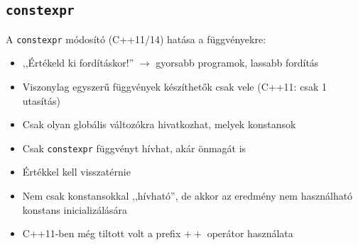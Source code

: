 \begin{frame}
    \begin{exampleblock}{}
        
    \end{exampleblock}
    \begin{exampleblock}{}
        
    \end{exampleblock}
\end{frame}

\subsection{\texttt{constexpr}}

\begin{frame}
    A \texttt{constexpr} módosító (C++11/14) hatása a függvényekre:
    \begin{itemize}
        \item ,,Értékeld ki fordításkor!'' $\to$ gyorsabb programok, lassabb fordítás
        \item Viszonylag egyszerű függvények készíthetők csak vele (C++11: csak 1 utasítás)
        \item Csak olyan globális változókra hivatkozhat, melyek konstansok
        \item Csak \texttt{constexpr} függvényt hívhat, akár önmagát is
        \item Értékkel kell visszatérnie
        \item Nem csak konstansokkal ,,hívható'', de akkor az eredmény nem használható konstans inicializálására
        \item C++11-ben még tiltott volt a prefix $++$ operátor használata
    \end{itemize}
\end{frame}

\begin{frame}
    \begin{exampleblock}{}
        \scriptsize
        
    \end{exampleblock}
\end{frame}

